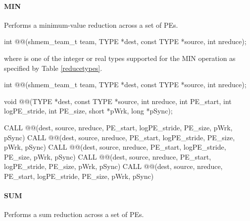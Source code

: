 \begin{apidefinition}
\paragraph{MIN}
Performs a minimum-value reduction across a set of \acp{PE}.\newline

{\color{Green}
\begin{C11synopsis}
int @@(shmem_team_t team, TYPE *dest, const TYPE *source, int nreduce);
\end{C11synopsis}
where \TYPE{} is one of the integer or real types supported for the MIN operation as specified by Table \ref{reducetypes}.
}

\begin{Csynopsis}
\end{Csynopsis}
{\color{Green}
\begin{CsynopsisCol}
int @@(shmem_team_t team, TYPE *dest, const TYPE *source, int nreduce);
\end{CsynopsisCol}
}
\begin{DeprecateBlock}
\begin{CsynopsisCol}
void @@(TYPE *dest, const TYPE *source, int nreduce, int PE_start, int logPE_stride, int PE_size, short *pWrk, long *pSync);
\end{CsynopsisCol}
\end{DeprecateBlock}

\begin{Fsynopsis}
CALL @@(dest, source, nreduce, PE_start, logPE_stride, PE_size, pWrk, pSync)
CALL @@(dest, source, nreduce, PE_start, logPE_stride, PE_size, pWrk, pSync)
CALL @@(dest, source, nreduce, PE_start, logPE_stride, PE_size, pWrk, pSync)
CALL @@(dest, source, nreduce, PE_start, logPE_stride, PE_size, pWrk, pSync)
CALL @@(dest, source, nreduce, PE_start, logPE_stride, PE_size, pWrk, pSync)
\end{Fsynopsis}

\paragraph{SUM}
Performs a sum reduction across a set of \acp{PE}.\newline


\end{apidefinition}
